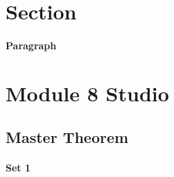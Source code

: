 \documentclass[../main.tex]{subfiles}
\begin{document}
\section{Section}
\barh 

\paragraph{Paragraph}


\section{Module 8 Studio}

\subsection{Master Theorem}

\paragraph{Set 1}
\end{document}
